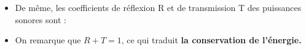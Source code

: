 \documentclass[a4paper]{article}
\begin{document}
\begin{itemize}
\item De même, les coefficients de réflexion R et de transmission T des puissances sonores sont :
\begin{center}
\end{center}
\begin{center}
\end{center}

\item On remarque que $R+T=1$, ce qui traduit \textbf{la conservation de l'énergie.}

\end{itemize}
\end{document}
